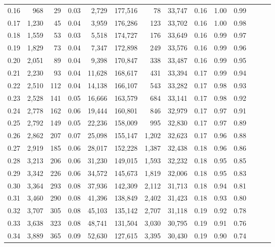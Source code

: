 \begin{tabular}{rrrrrrrrrrrrrr}
0.16 &    968 &   29 &  0.03 &    2,729 &  177,516 &      78 &  33,747 &  0.16 &  1.00 &      0.99 \\
0.17 &  1,230 &   45 &  0.04 &    3,959 &  176,286 &     123 &  33,702 &  0.16 &  1.00 &      0.98 \\
0.18 &  1,559 &   53 &  0.03 &    5,518 &  174,727 &     176 &  33,649 &  0.16 &  0.99 &      0.97 \\
0.19 &  1,829 &   73 &  0.04 &    7,347 &  172,898 &     249 &  33,576 &  0.16 &  0.99 &      0.96 \\
0.20 &  2,051 &   89 &  0.04 &    9,398 &  170,847 &     338 &  33,487 &  0.16 &  0.99 &      0.95 \\
0.21 &  2,230 &   93 &  0.04 &   11,628 &  168,617 &     431 &  33,394 &  0.17 &  0.99 &      0.94 \\
0.22 &  2,510 &  112 &  0.04 &   14,138 &  166,107 &     543 &  33,282 &  0.17 &  0.98 &      0.93 \\
0.23 &  2,528 &  141 &  0.05 &   16,666 &  163,579 &     684 &  33,141 &  0.17 &  0.98 &      0.92 \\
0.24 &  2,778 &  162 &  0.06 &   19,444 &  160,801 &     846 &  32,979 &  0.17 &  0.97 &      0.91 \\
0.25 &  2,792 &  149 &  0.05 &   22,236 &  158,009 &     995 &  32,830 &  0.17 &  0.97 &      0.89 \\
0.26 &  2,862 &  207 &  0.07 &   25,098 &  155,147 &   1,202 &  32,623 &  0.17 &  0.96 &      0.88 \\
0.27 &  2,919 &  185 &  0.06 &   28,017 &  152,228 &   1,387 &  32,438 &  0.18 &  0.96 &      0.86 \\
0.28 &  3,213 &  206 &  0.06 &   31,230 &  149,015 &   1,593 &  32,232 &  0.18 &  0.95 &      0.85 \\
0.29 &  3,342 &  226 &  0.06 &   34,572 &  145,673 &   1,819 &  32,006 &  0.18 &  0.95 &      0.83 \\
0.30 &  3,364 &  293 &  0.08 &   37,936 &  142,309 &   2,112 &  31,713 &  0.18 &  0.94 &      0.81 \\
0.31 &  3,460 &  290 &  0.08 &   41,396 &  138,849 &   2,402 &  31,423 &  0.18 &  0.93 &      0.80 \\
0.32 &  3,707 &  305 &  0.08 &   45,103 &  135,142 &   2,707 &  31,118 &  0.19 &  0.92 &      0.78 \\
0.33 &  3,638 &  323 &  0.08 &   48,741 &  131,504 &   3,030 &  30,795 &  0.19 &  0.91 &      0.76 \\
0.34 &  3,889 &  365 &  0.09 &   52,630 &  127,615 &   3,395 &  30,430 &  0.19 &  0.90 &      0.74 \\

\end{tabular}

